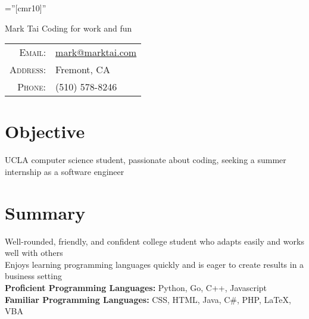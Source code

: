 \documentclass[a4paper,10pt]{article}
\begin{document}

\pagestyle{empty} %

\font\fb=''[cmr10]'' %



\begin{minipage}{0.7\textwidth}%
\par{
	{\fontsize{40}{50}\selectfont Mark Tai}
	\Large \hspace{.2em} Coding for work and fun
    }
\end{minipage}%
\hfill%
\begin{minipage}{0.3\textwidth}
\begin{tabular}{r|l}
    \textsc{Email:}     & \href{mailto:mark@marktai.com}{mark@marktai.com} \\
    \textsc{Address:}   & Fremont, CA \\
    \textsc{Phone:}     & (510) 578-8246\\
\end{tabular}
\end{minipage}

\section{Objective}
UCLA computer science student, passionate about coding, seeking a summer internship as a software engineer

\section{Summary}
\textbullet \hspace{.1em} Well-rounded, friendly, and confident college student who adapts easily and works well with others \\
\textbullet \hspace{.1em} Enjoys learning programming languages quickly and is eager to create results in a business setting \\
\textbullet \hspace{.1em} \textbf{Proficient Programming Languages:} Python, Go, C++, Javascript\\
\textbullet \hspace{.1em} \textbf{Familiar Programming Languages:} CSS, HTML, Java, C\#, PHP, LaTeX, VBA
\end{document}
